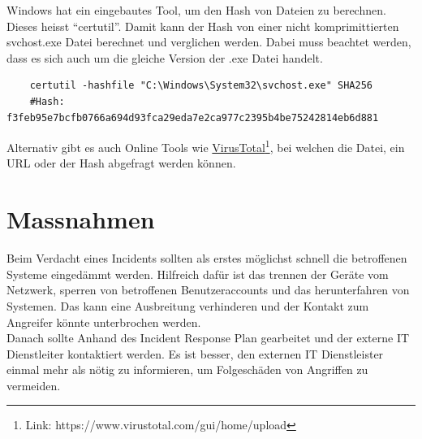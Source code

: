 Windows hat ein eingebautes Tool, um den Hash von Dateien zu berechnen.
Dieses heisst ``certutil''.
Damit kann der Hash von einer nicht komprimittierten svchost.exe Datei berechnet und verglichen werden.
Dabei muss beachtet werden, dass es sich auch um die gleiche Version der .exe Datei handelt.

\begin{lstlisting}
    certutil -hashfile "C:\Windows\System32\svchost.exe" SHA256
    #Hash: f3feb95e7bcfb0766a694d93fca29eda7e2ca977c2395b4be75242814eb6d881
\end{lstlisting}

Alternativ gibt es auch Online Tools wie \href{https://www.virustotal.com/gui/home/upload}{VirusTotal}\footnote{Link: https://www.virustotal.com/gui/home/upload}, bei welchen die Datei, ein URL oder der Hash abgefragt werden können.

\section{Massnahmen}
Beim Verdacht eines Incidents sollten als erstes möglichst schnell die betroffenen Systeme eingedämmt werden. 
Hilfreich dafür ist das trennen der Geräte vom Netzwerk, sperren von betroffenen Benutzeraccounts und das herunterfahren von Systemen.
Das kann eine Ausbreitung verhinderen und der Kontakt zum Angreifer könnte unterbrochen werden.\\

Danach sollte Anhand des Incident Response Plan gearbeitet und der externe IT Dienstleiter kontaktiert werden.
Es ist besser, den externen IT Dienstleister einmal mehr als nötig zu informieren, um Folgeschäden von Angriffen zu vermeiden. 